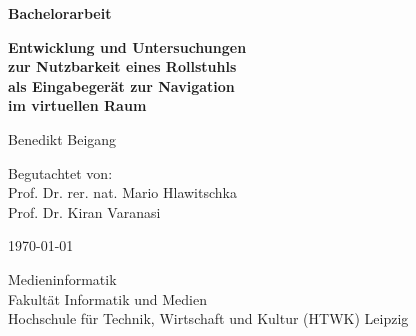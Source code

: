 \begin{titlepage}
    \begin{center}
        \vspace*{1cm}

        \textbf{\Huge{Bachelorarbeit}}

        \vspace{0.5cm}

        \textbf{\huge
            {
                Entwicklung und Untersuchungen\\
                zur Nutzbarkeit eines Rollstuhls\\
                als Eingabegerät zur Navigation\\
                im virtuellen Raum\\
            }}

        \vspace{1.5cm}

        \LARGE{Benedikt Beigang}

        \vfill

        \large
        {
            Begutachtet von:\\
            Prof. Dr. rer. nat. Mario Hlawitschka\\
            Prof. Dr. Kiran Varanasi
        }

        \vspace{2.5cm}

        \today

        \vspace{0.5cm}

        \large{
            Medieninformatik\\
            Fakultät Informatik und Medien\\
            Hochschule für Technik, Wirtschaft und Kultur (HTWK) Leipzig
        }

    \end{center}
\end{titlepage}